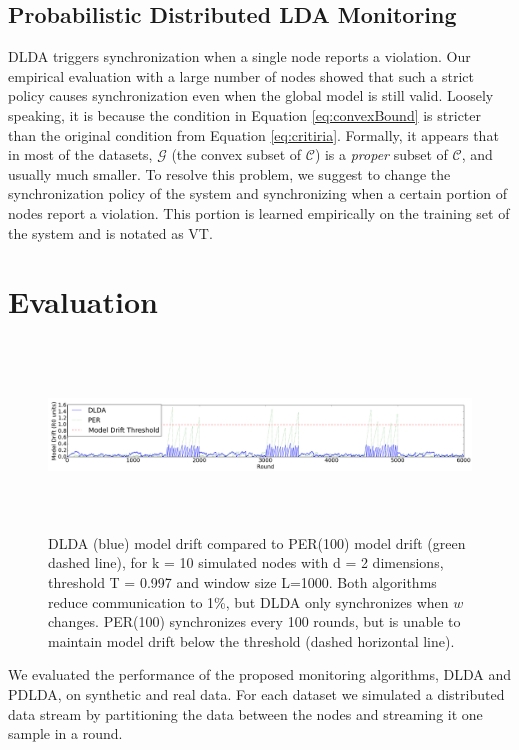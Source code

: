 \documentclass{vldb}
\begin{document}
\subsection{Probabilistic Distributed LDA Monitoring}\label{sec:PDLDA}

DLDA triggers synchronization when a single node reports a violation.
Our empirical evaluation with a large number of nodes showed that such a strict
policy causes synchronization even when the global model is still valid. Loosely speaking, it is because the condition in Equation \ref{eq:convexBound} is stricter than the original condition from Equation \ref{eq:critiria}. Formally, it appears that in most of the datasets, $\mathcal{G}$ (the  convex subset of $\mathcal{C}$) is a \textit{proper} subset of $\mathcal{C}$, and usually much smaller. To resolve this problem, we suggest to change the synchronization policy of the system and synchronizing when a certain portion of nodes report a violation.
This portion is learned empirically on the training set of the system and is notated as VT.




\section{Evaluation}
\begin{figure}[ht]
	\centering
	\includegraphics[width=\textwidth, height=5cm]{PER/PERvsDLDAoverTime.png}
	\caption{ DLDA (blue) model drift compared to PER(100) model drift (green dashed line), for k = 10 simulated nodes with d = 2 dimensions, threshold T = 0.997 and window size L=1000. Both algorithms reduce communication to 1\%, but DLDA
	only synchronizes when $w$ changes. PER(100) synchronizes every 100 rounds,
	but is unable to maintain model drift below the threshold (dashed horizontal line).}
	\label{PERvsDLDAoverTime}
\end{figure}

We evaluated the performance of the proposed monitoring algorithms, DLDA and PDLDA, on synthetic and real data. For each dataset we simulated a distributed data stream by partitioning the data between the nodes and streaming it one sample in a round. 
\end{document}

